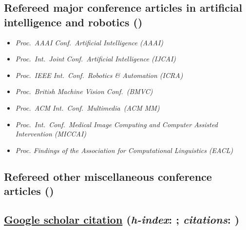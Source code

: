 \documentclass[9pt, a4paper]{article}
\begin{document}
\subsection*{Refereed major conference articles in artificial intelligence and robotics (\unskip)
}
{
\begin{itemize}
  \itemsep -.12cm
\footnotesize
\item \emph{  Proc.\ AAAI Conf.\ Artificial Intelligence (AAAI)}
\item \emph{  Proc.\ Int.\ Joint Conf.\ Artificial Intelligence (IJCAI)}
\item \emph{  Proc.\ IEEE Int.\ Conf.\  Robotics \&  Automation (ICRA)}
\item \emph{  Proc.\ British Machine Vision Conf.\ (BMVC)}
\item \emph{  Proc.\ ACM Int.\  Conf.\  Multimedia\ (ACM MM)}
\item \emph{  Proc.\ Int.\ Conf.\ Medical Image Computing and Computer Assisted Intervention (MICCAI)}
\item \emph{  Proc. Findings of the Association for Computational Linguistics (EACL)}
\end{itemize}
}




\noindent






\vspace{-0.15cm}
\subsection*{Refereed other miscellaneous  conference articles (\unskip)}
\noindent









\subsection*{\href{https://scholar.google.com/citations?hl=en&user=Ljk2BvIAAAAJ&view_op=list_works}{Google scholar citation} ({\it h-index}:  \unskip; {\it citations}: \unskip) }
\end{document}
